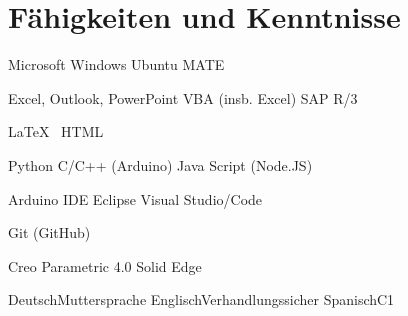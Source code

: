 \section*{Fähigkeiten und Kenntnisse}

%
	{Microsoft Windows}{\fundiert}
	{Ubuntu MATE}{\fortgeschritten}
	{}{}
	{}{}

%
	{Excel, Outlook, PowerPoint}{\fundiert}
	{VBA (insb. Excel)}{\fundiert}
	{SAP R/3}{\fortgeschritten}
	{}{}
	
%
	{\LaTeX\ }{\gut}
	{HTML}{\grundlegend}
	{}{}
	{}{}

%
	{Python}{\gut}	
	{C/C++ (Arduino)}{\gut}
	{Java Script (Node.JS)}{\gut}
	{}{}

	{Arduino IDE}{\gut}	
	{Eclipse}{\fortgeschritten}
	{Visual Studio/Code}{\grundlegend}
	{}{}

	{Git (GitHub)}{\grundlegend}
	{}{}
	{}{}
	{}{}





%

	{Creo Parametric 4.0}{\fundiert}
	{Solid Edge}{\gut}
	{}{}
	{}{}
	

	{Deutsch}{Muttersprache}
	{Englisch}{Verhandlungssicher}
	{Spanisch}{C1}
	{}{}
	
	
